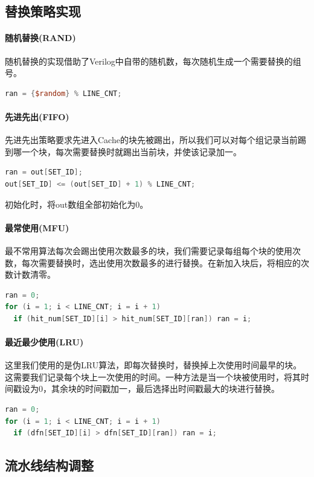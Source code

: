 \documentclass[12pt]{article} %
\begin{document}
\begin{sloppypar}
\subsection{替换策略实现}

\paragraph{随机替换(RAND)} 随机替换的实现借助了Verilog中自带的随机数，每次随机生成一个需要替换的组号。
\begin{lstlisting}[language=Verilog]
ran = {$random} % LINE_CNT;
\end{lstlisting}

\paragraph{先进先出(FIFO)} 先进先出策略要求先进入Cache的块先被踢出，所以我们可以对每个组记录当前踢到哪一个块，每次需要替换时就踢出当前块，并使该记录加一。
\begin{lstlisting}[language=Verilog]
ran = out[SET_ID];
out[SET_ID] <= (out[SET_ID] + 1) % LINE_CNT;
\end{lstlisting}
初始化时，将out数组全部初始化为0。

\paragraph{最常使用(MFU)} 最不常用算法每次会踢出使用次数最多的块，我们需要记录每组每个块的使用次数，每次需要替换时，选出使用次数最多的进行替换。在新加入块后，将相应的次数计数清零。
\begin{lstlisting}[language=Verilog]
ran = 0;
for (i = 1; i < LINE_CNT; i = i + 1)
  if (hit_num[SET_ID][i] > hit_num[SET_ID][ran]) ran = i;
\end{lstlisting}

\paragraph{最近最少使用(LRU)} 这里我们使用的是伪LRU算法，即每次替换时，替换掉上次使用时间最早的块。这需要我们记录每个块上一次使用的时间。一种方法是当一个块被使用时，将其时间戳设为0，其余块的时间戳加一，最后选择出时间戳最大的块进行替换。
\begin{lstlisting}[language=Verilog]
ran = 0;
for (i = 1; i < LINE_CNT; i = i + 1)
  if (dfn[SET_ID][i] > dfn[SET_ID][ran]) ran = i;
\end{lstlisting}

\subsection{流水线结构调整}
\label{sec:pipe}


\end{sloppypar}
\end{document}
